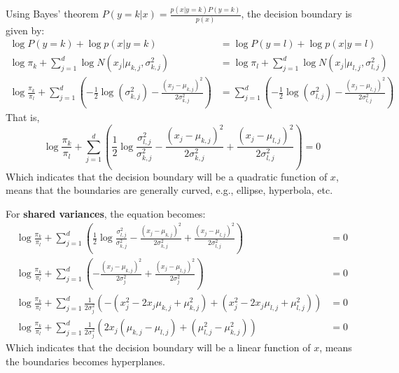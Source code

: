 \documentclass[11pt, a4paper, oneside]{memoir}
\begin{document}
Using Bayes' theorem $P(y=k|x) = \frac{p(x|y=k)P(y=k)}{p(x)}$, the decision boundary is given by:
\begin{align*}
    \log P(y=k) + \log p(x|y=k)                                         & = \log P(y=l) + \log p(x|y=l)                                                                                   \\
    \log \pi_k + \sum_{j=1}^{d} \log N(x_j | \mu_{k,j}, \sigma^2_{k,j}) & = \log \pi_l + \sum_{j=1}^{d} \log N(x_j | \mu_{l,j}, \sigma^2_{l,j})                                           \\
    \log \frac{\pi_k}{\pi_l} + \sum_{j=1}^{d} \left( -\frac{1}{2} \log(\sigma^2_{k,j}) - \frac{(x_j - \mu_{k,j})^2}{2\sigma^2_{k,j}} \right)
                                                                        & = \sum_{j=1}^{d} \left( -\frac{1}{2} \log(\sigma^2_{l,j}) - \frac{(x_j - \mu_{l,j})^2}{2\sigma^2_{l,j}} \right)
\end{align*}
That is,
\[ \log \frac{\pi_k}{\pi_l} + \sum_{j=1}^{d} \left( \frac{1}{2} \log \frac{\sigma^2_{l,j}}{\sigma^2_{k,j}} - \frac{(x_j - \mu_{k,j})^2}{2\sigma^2_{k,j}} + \frac{(x_j - \mu_{l,j})^2}{2\sigma^2_{l,j}} \right) = 0 \]
Which indicates that the decision boundary will be a quadratic function of $x$,
means that the boundaries are generally curved, e.g., ellipse, hyperbola, etc.

For \textbf{shared variances}, the equation becomes:
\begin{align*}
    \log \frac{\pi_k}{\pi_l} + \sum_{j=1}^{d} \left( \frac{1}{2} \log \frac{\sigma^2_{l,j}}{\sigma^2_{k,j}} - \frac{(x_j - \mu_{k,j})^2}{2\sigma^2_{k,j}} + \frac{(x_j - \mu_{l,j})^2}{2\sigma^2_{l,j}} \right) & = 0 \\
    \log \frac{\pi_k}{\pi_l} + \sum_{j=1}^{d} \left( -\frac{(x_j - \mu_{k,j})^2}{2\sigma^2_{j}} + \frac{(x_j - \mu_{l,j})^2}{2\sigma^2_{j}} \right)                                                             & = 0 \\
    \log \frac{\pi_k}{\pi_l} + \sum_{j=1}^{d} \frac{1}{2\sigma^2_{j}} \left( -(x_j^2 - 2x_j\mu_{k,j} + \mu_{k,j}^2) + (x_j^2 - 2x_j\mu_{l,j} + \mu_{l,j}^2) \right)                                             & = 0 \\
    \log \frac{\pi_k}{\pi_l} + \sum_{j=1}^{d} \frac{1}{2\sigma^2_{j}} \left( 2x_j(\mu_{k,j} - \mu_{l,j}) + (\mu_{l,j}^2 - \mu_{k,j}^2) \right)                                                                  & = 0
\end{align*}
Which indicates that the decision boundary will be a linear function of $x$,
means the boundaries becomes hyperplanes.
\end{document}
